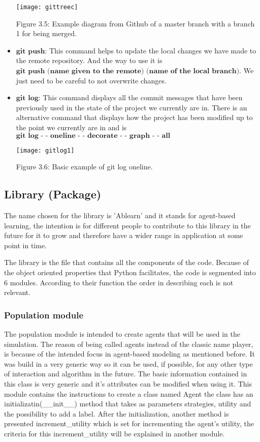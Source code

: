 \documentclass{article}
\begin{document}
\begin{itemize}
\begin{center}
	\texttt{[image: gittreec]}

Figure 3.5: Example diagram from Github of a master branch with a branch 1 for being merged.
\end{center}
	
	\item $\textbf{git push:}$ This command helps to update the local changes we have made to the remote repository. And the way to use it is $\textbf{git push (name given to the remote) (name of the local branch)}$. We just need to be careful to not overwrite changes. 
	\item $\textbf{git log:}$  This command displays all the commit messages that have been previously used in the state of the project we currently are in. There is an alternative command that displays how the project has been modified up to the point we currently are in and is $\textbf{git log - - oneline  - - decorate - - graph - - all}$

\begin{center}
	\texttt{[image: gitlog1]}

Figure 3.6: Basic example of git log oneline.
\end{center}

\end{itemize}

\newpage
\subsection{Library (Package)}\label{library_section}
The name chosen for the library is 'Ablearn' and it stands for agent-based learning, the intention is for different people to contribute to this library in the future for it to grow and therefore have a wider range in application at some point in time.

The library is the file that contains all the components of the code. Because of the object oriented properties that Python facilitates, the code is segmented into 6 modules. According to their function the order in describing each is not relevant.

\subsubsection{Population module}
The population module is intended to create agents that will be used in the simulation. The reason of being called agents instead of the classic name player, is because of the intended focus in agent-based modeling as mentioned before. It was build in a very generic way so it can be used, if possible, for any other type of interaction and algorithm in the future. The basic information contained in this class is very generic and it's attributes can be modified when using it. 
This module contains the instructions to create a class named Agent the class has an initializatin(\_\_init\_\_) method that takes as parameters strategies, utility and the possibility to add a label. After the initialization, another method is presented increment\_utility which is set for incrementing the agent’s utility, the criteria for this increment\_utility will be explained in another module.
\end{document}
